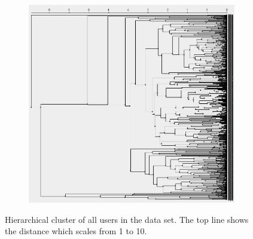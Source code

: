 \documentclass[conference]{IEEEtran}
\begin{document}
\begin{figure}[!h]
        \centering
        \begin{subfigure}[b]{0.50\textwidth}
                \includegraphics[width=\textwidth]{charts/cluster.jpg}
        \end{subfigure}
        \caption{Hierarchical cluster of all users in the data set. The top line shows the distance which scales from 1 to 10.}
        \label{fig:cluster}
\end{figure}
\end{document}
